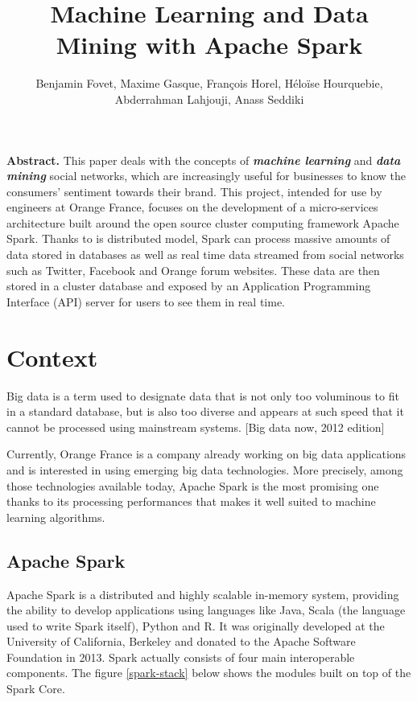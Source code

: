 \documentclass[11pt]{article}
\title{\textbf{Machine Learning and Data Mining with Apache Spark}}
\author{Benjamin Fovet, Maxime Gasque, François Horel, Héloïse Hourquebie, Abderrahman Lahjouji, Anass Seddiki}
\affil{\texttt{\{bfovet, mgasque, fhorel, hhourquebie, alahjouji, aseddiki\} @enseirb-matmeca.fr}}
\date{}
\begin{document}
\maketitle

\textbf{Abstract.} This paper deals with the concepts of \textbf{\textit{machine learning}} and \textbf{\textit{data mining}} social networks, which are increasingly useful for businesses to know the consumers' sentiment towards their brand. This project, intended for use by engineers at Orange France, focuses on the development of a micro-services architecture built around the open source cluster computing framework Apache Spark. Thanks to is distributed model, Spark can process massive amounts of data stored in databases as well as real time data streamed from social networks such as Twitter, Facebook and Orange forum websites. These data are then stored in a cluster database and exposed by an Application Programming Interface (API) server for users to see them in real time.


\section{Context}
Big data is a term used to designate data that is not only too voluminous to fit in a standard database, but is also too diverse and appears at such speed that it cannot be processed using mainstream systems. [Big data now, 2012 edition]

Currently, Orange France is a company already working on big data applications and is interested in using emerging big data technologies. More precisely, among those technologies available today, Apache Spark is the most promising one thanks to its processing performances that makes it well suited to machine learning algorithms.

\subsection{Apache Spark}
\label{apache spark}
Apache Spark is a distributed and highly scalable in-memory system, providing the ability to develop applications using languages like Java, Scala (the language used to write Spark itself), Python and R. It was originally developed at the University of California, Berkeley and donated to the Apache Software Foundation in 2013.
Spark actually consists of four main interoperable components. The figure \ref{spark-stack} below shows the modules built on top of the Spark Core.
\end{document}
